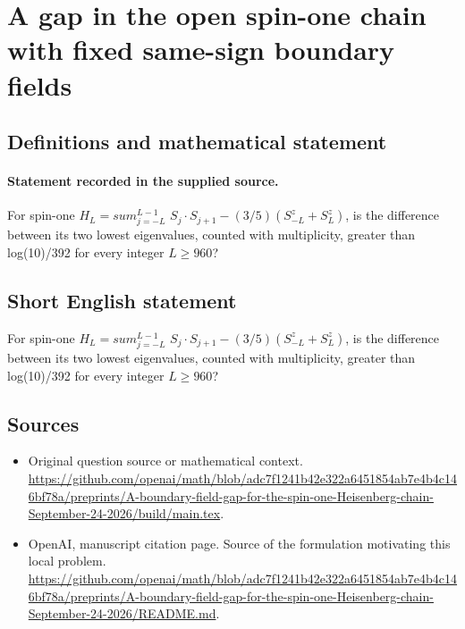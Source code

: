 \documentclass[11pt]{article}
\begin{document}
\section*{A gap in the open spin-one chain with fixed same-sign boundary fields}\label{30007214}
\subsection{Definitions and mathematical statement}
\paragraph{Statement recorded in the supplied source.}
For spin-one $H_L=sum_{j=-L}^{L-1}$ $S_j\cdot S_{j+1}-(3/5)(S_{-L}^z+S_L^z)$, is the difference between its two lowest eigenvalues, counted with multiplicity, greater than log(10)/392 for every integer $L\geq 960$?
\subsection{Short English statement}
For spin-one $H_L=sum_{j=-L}^{L-1}$ $S_j\cdot S_{j+1}-(3/5)(S_{-L}^z+S_L^z)$, is the difference between its two lowest eigenvalues, counted with multiplicity, greater than log(10)/392 for every integer $L\geq 960$?
\subsection{Sources}
\begin{itemize}
\item[S1] Original question source or mathematical context.
\url{https://github.com/openai/math/blob/adc7f1241b42e322a6451854ab7e4b4c146bf78a/preprints/A-boundary-field-gap-for-the-spin-one-Heisenberg-chain-September-24-2026/build/main.tex}.
\item[S2] OpenAI, manuscript citation page. Source of the formulation motivating this local problem.
\url{https://github.com/openai/math/blob/adc7f1241b42e322a6451854ab7e4b4c146bf78a/preprints/A-boundary-field-gap-for-the-spin-one-Heisenberg-chain-September-24-2026/README.md}.
\end{itemize}
\end{document}
